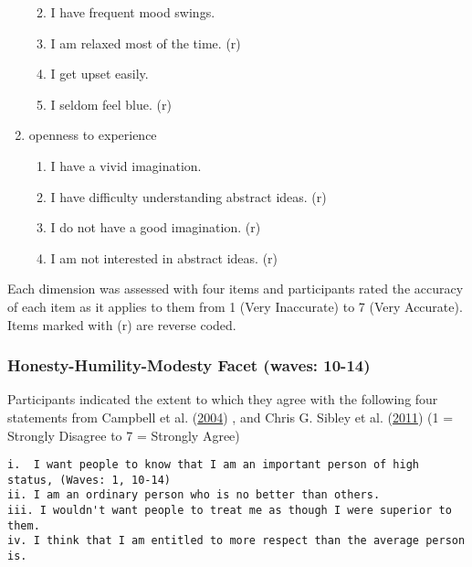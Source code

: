 \documentclass[
  singlecolumn]{report}
\providecommand{\tightlist}{%
  \setlength{\itemsep}{0pt}\setlength{\parskip}{0pt}}\usepackage{longtable,booktabs,array}
\begin{document}
\begin{enumerate}
  \begin{enumerate}
  \def\labelenumii{\roman{enumii}.}
  \tightlist
  \item
    I have frequent mood swings.
  \item
    I am relaxed most of the time. (r)
  \item
    I get upset easily.
  \item
    I seldom feel blue. (r)
  \end{enumerate}
\item
  openness to experience

  \begin{enumerate}
  \def\labelenumii{\roman{enumii}.}
  \tightlist
  \item
    I have a vivid imagination.
  \item
    I have difficulty understanding abstract ideas. (r)
  \item
    I do not have a good imagination. (r)
  \item
    I am not interested in abstract ideas. (r)
  \end{enumerate}
\end{enumerate}

Each dimension was assessed with four items and participants rated the
accuracy of each item as it applies to them from 1 (Very Inaccurate) to
7 (Very Accurate). Items marked with (r) are reverse coded.

\hypertarget{honesty-humility-modesty-facet-waves-10-14}{%
\subsubsection{Honesty-Humility-Modesty Facet (waves:
10-14)}\label{honesty-humility-modesty-facet-waves-10-14}}

Participants indicated the extent to which they agree with the following
four statements from Campbell et al.
(\protect\hyperlink{ref-campbell2004}{2004}) , and Chris G. Sibley et
al. (\protect\hyperlink{ref-sibley2011}{2011}) (1 = Strongly Disagree to
7 = Strongly Agree)

\begin{verbatim}
i.  I want people to know that I am an important person of high status, (Waves: 1, 10-14)
ii. I am an ordinary person who is no better than others.
iii. I wouldn't want people to treat me as though I were superior to them.
iv. I think that I am entitled to more respect than the average person is.
\end{verbatim}
\end{document}
